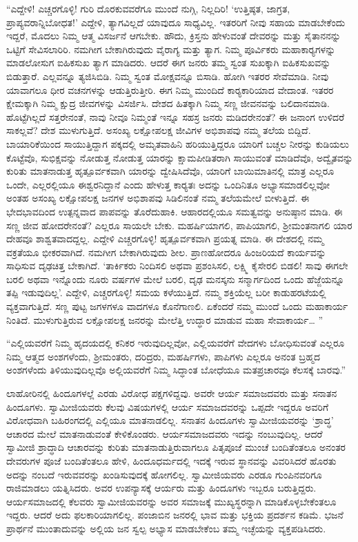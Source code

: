  “ಎದ್ದೇಳಿ! ಎಚ್ಚರಗೊಳ್ಳಿ! ಗುರಿ ದೊರಕುವವರೆಗೂ ಮುಂದೆ ನುಗ್ಗಿ, ನಿಲ್ಲದಿರಿ! ‘ಉತ್ತಿಷ್ಠತ, ಜಾಗ್ರತ, ಪ್ರಾಪ್ಯವರಾನ್ನಿಬೋಧತ!’ ಎದ್ದೇಳಿ, ತ್ಯಾಗವಿಲ್ಲದೆ ಯಾವುದೂ ಸಾಧ್ಯವಿಲ್ಲ. ಇತರರಿಗೆ ನೀವು ಸಹಾಯ ಮಾಡಬೇಕೆಂದು ಇದ್ದರೆ, ಮೊದಲು ನಿಮ್ಮ ಆತ್ಮ ವಿಸರ್ಜನೆ ಆಗಬೇಕು. ಹೌದು, ಕ್ರಿಸ್ತನು ಹೇಳುವಂತೆ ದೇವರನ್ನು ಮತ್ತು ಸೈತಾನನನ್ನು ಒಟ್ಟಿಗೆ ಸೇವಿಸಲಾರಿರಿ. ನಮಗೀಗ ಬೇಕಾಗಿರುವುದು ವೈರಾಗ್ಯ ಮತ್ತು ತ್ಯಾಗ. ನಿಮ್ಮ ಪೂರ್ವಿಕರು ಮಹಾಕಾರ‍್ಯಗಳನ್ನು ಮಾಡಲೋಸುಗ ಐಹಿಕಸುಖ ತ್ಯಾಗ ಮಾಡಿದರು. ಆದರೆ ಈಗ ಜನರು ತಮ್ಮ ಸ್ವಂತ ಸುಖಕ್ಕಾಗಿ ಐಹಿಕಸುಖವನ್ನು ಬಿಡುತ್ತಾರೆ. ಎಲ್ಲವನ್ನೂ ತ್ಯಜಿಸಿಬಿಡಿ. ನಿಮ್ಮ ಸ್ವಂತ ಮೋಕ್ಷವನ್ನೂ ಬಿಸಾಡಿ. ಹೋಗಿ ಇತರರ ಸೇವೆಮಾಡಿ. ನೀವು ಯಾವಾಗಲೂ ಧೀರ ವಚನಗಳನ್ನು ಆಡುತ್ತಿರುತ್ತೀರಿ. ಈಗ ನಿಮ್ಮ ಮುಂದಿದೆ ಕಾರ‍್ಯಕಾರಿಯಾದ ವೇದಾಂತ. ಇತರರ ಕ್ಷೇಮಕ್ಕಾಗಿ ನಿಮ್ಮ ಕ್ಷುದ್ರ ಜೀವಗಳನ್ನು ವಿಸರ್ಜಿಸಿ. ದೇಶದ ಹಿತಕ್ಕಾಗಿ ನಿಮ್ಮ ಸಣ್ಣ ಜೀವನವನ್ನು ಬಲಿದಾನಮಾಡಿ. ಹೊಟ್ಟೆಗಿಲ್ಲದೆ ಸತ್ತರೇನಂತೆ, ನಾವು ನೀವೂ ನಿಮ್ಮಂತೆ ಇನ್ನೂ ಸಹಸ್ರ ಜನರು ಮಡಿದರೇನಂತೆ? ಈ ಜನಾಂಗ ಉಳಿದರೆ ಸಾಕಲ್ಲವೆ? ದೇಶ ಮುಳುಗುತ್ತಿದೆ. ಅಸಂಖ್ಯ ಲಕ್ಷೋಪಲಕ್ಷ ಜೀವಿಗಳ ಅಭಿಶಾಪವು ನಮ್ಮ ತಲೆಯ ಬಿದ್ದಿದೆ. ಬಾಯಾರಿಕೆಯಿಂದ ಸಾಯುತ್ತಿದ್ದಾಗ ಪಕ್ಕದಲ್ಲಿ ಅಮೃತವಾಹಿನಿ ಹರಿಯುತ್ತಿದ್ದರೂ ಯಾರಿಗೆ ಬಚ್ಚಲ ನೀರನ್ನು ಕುಡಿಯಲು ಕೊಟ್ಟೆವೊ, ಸುಭಿಕ್ಷವನ್ನು ನೋಡುತ್ತ ನೋಡುತ್ತ ಯಾರನ್ನು ಕ್ಷಾಮಪೀಡಿತರಾಗಿ ಸಾಯುವಂತೆ ಮಾಡಿದೆವೊ, ಅದ್ವೈತವನ್ನು ಕುರಿತು ಮಾತನಾಡುತ್ತ ಹೃತ್ಪೂರ್ವಕವಾಗಿ ಯಾರನ್ನು ದ್ವೇಷಿಸಿದೆವೊ, ಯಾರಿಗೆ ಬಾಯಿಮಾತಿನಲ್ಲಿ ಮಾತ್ರ ಎಲ್ಲರೂ ಒಂದೇ, ಎಲ್ಲರಲ್ಲಿಯೂ ಈಶ್ವರನಿದ್ದಾನೆ ಎಂದು ಹೇಳುತ್ತ ಕಾರ‍್ಯತಃ ಅದನ್ನು ಒಂದಿನಿತೂ ಅಭ್ಯಾಸಮಾಡಲಿಲ್ಲವೋ ಅಂತಹ ಅಸಂಖ್ಯ ಲಕ್ಷೋಪಲಕ್ಷ ಜನಗಳ ಅಭಿಶಾಪವು ಸಿಡಿಲಿನಂತೆ ನಮ್ಮ ತಲೆಯಮೇಲೆ ಬೀಳುತ್ತಿದೆ. ಈ ಭೇದಭಾವದಿಂದ ಉತ್ಪನ್ನವಾದ ಪಾಪವನ್ನು ತೊರೆದುಹಾಕಿ. ಆಹಾರದಲ್ಲಿಯೂ ಸಮತ್ವವನ್ನು ಅನುಷ್ಠಾನ ಮಾಡಿ. ಈ ಸಣ್ಣ ಜೀವ ಹೋದರೇನಂತೆ? ಎಲ್ಲರೂ ಸಾಯಲೇ ಬೇಕು. ಮಹರ್ಷಿಯಾಗಲಿ, ಪಾಪಿಯಾಗಲಿ, ಶ‍್ರೀಮಂತನಾಗಲಿ ಯಾರ ದೇಹವೂ ಶಾಶ್ವತವಾದದ್ದಲ್ಲ. ಎದ್ದೇಳಿ ಎಚ್ಚರಗೊಳ್ಳಿ! ಹೃತ್ಪೂರ್ವಕವಾಗಿ ಪ್ರಯತ್ನ ಮಾಡಿ. ಈ ದೇಶದಲ್ಲಿ ನಮ್ಮ ವಕ್ರತೆಯೂ ಭೀಕರವಾಗಿದೆ. ನಮಗೀಗ ಬೇಕಾಗಿರುವುದು ಶೀಲ. ಪ್ರಾಣಹೋದರೂ ಹಿಂಜರಿಯದೆ ಕಾರ್ಯವನ್ನು ಸಾಧಿಸುವ ದೃಢಚಿತ್ತ ಬೇಕಾಗಿದೆ. ‘ತಾರ್ಕಿಕರು ನಿಂದಿಸಲಿ ಅಥವಾ ಪ್ರಶಂಸಿಸಲಿ, ಲಕ್ಷ್ಮಿ ಕೈಸೇರಲಿ ಬಿಡಲಿ! ಸಾವು ಈಗಲೇ ಬರಲಿ ಅಥವಾ ಇನ್ನೊಂದು ನೂರು ವರ್ಷಗಳ ಮೇಲೆ ಬರಲಿ, ದೃಢ ಮನಸ್ಕನು ಸನ್ಮಾರ್ಗದಿಂದ ಒಂದು ಹೆಜ್ಜೆಯನ್ನೂ ತಪ್ಪಿ ಇಡುವುದಿಲ್ಲ’. ಎದ್ದೇಳಿ, ಎಚ್ಚರಗೊಳ್ಳಿ! ಸಮಯ ಕಳೆಯುತ್ತಿದೆ. ನಮ್ಮ ಶಕ್ತಿಯೆಲ್ಲ ಬರೀ ಕಾಡುಹರಟೆಯಲ್ಲಿ ವ್ಯಕ್ತವಾಗುತ್ತಿದೆ. ಸಣ್ಣ ಪುಟ್ಟ ಜಗಳಗಳೂ ವಾದಗಳೂ ಕೊನೆಗಾಣಲಿ. ಏಕೆಂದರೆ ನಮ್ಮ ಮುಂದೆ ಒಂದು ಮಹಾಕಾರ್ಯ ನಿಂತಿದೆ. ಮುಳುಗುತ್ತಿರುವ ಲಕ್ಷೋಪಲಕ್ಷ ಜನರನ್ನು ಮೇಲೆತ್ತಿ ಉದ್ಧಾರ ಮಾಡುವ ಮಹಾ ಸೇವಾಕಾರ್ಯ… ” 

 “ಎಲ್ಲಿಯವರೆಗೆ ನಿಮ್ಮ ಹೃದಯದಲ್ಲಿ ಕನಿಕರ ಇರುವುದಿಲ್ಲವೋ, ಎಲ್ಲಿಯವರೆಗೆ ವೇದಗಳು ಬೋಧಿಸುವಂತೆ ಎಲ್ಲರೂ ನಿಮ್ಮ ಆತ್ಮದ ಅಂಶಗಳೆಂದು, ಶ‍್ರೀಮಂತರು, ದರಿದ್ರರು, ಮಹರ್ಷಿಗಳು, ಪಾಪಿಗಳು ಎಲ್ಲರೂ ಅನಂತ ಬ್ರಹ್ಮದ ಅಂಶಗಳೆಂದು ತಿಳಿಯುವುದಿಲ್ಲವೊ ಅಲ್ಲಿಯವರೆಗೆ ನಿಮ್ಮ ಸಿದ್ಧಾಂತ ಬೋಧೆಯೂ ಮತಪ್ರಚಾರವೂ ಕೆಲಸಕ್ಕೆ ಬಾರವು.” 

 ಲಾಹೋರಿನಲ್ಲಿ ಹಿಂದೂಗಳಲ್ಲೆ ಎರಡು ವಿರೋಧ ಪಕ್ಷಗಳಿದ್ದವು. ಅವರೇ ಆರ್ಯ ಸಮಾಜದವರು ಮತ್ತು ಸನಾತನ ಹಿಂದೂಗಳು. ಸ್ವಾಮೀಜಿಯವರು ಕೆಲವು ವಿಷಯಗಳಲ್ಲಿ ಆರ್ಯ ಸಮಾಜದವರನ್ನು ಒಪ್ಪದೇ ಇದ್ದರೂ ಅವರಿಗೆ ವಿರೋಧವಾಗಿ ಬಹಿರಂಗದಲ್ಲಿ ಎಲ್ಲಿಯೂ ಮಾತನಾಡಲಿಲ್ಲ. ಸನಾತನ ಹಿಂದೂಗಳು ಸ್ವಾಮೀಜಿಯವರನ್ನು ‘ಶ್ರಾದ್ಧ’ ಆಚಾರದ ಮೇಲೆ ಮಾತನಾಡುವಂತೆ ಕೇಳಿಕೊಂಡರು. ಆರ್ಯಸಮಾಜದವರು ಇದನ್ನು ನಂಬುವುದಿಲ್ಲ. ಆದರೆ ಸ್ವಾಮೀಜಿ ಶ್ರಾದ್ಧಾದಿ ಆಚಾರವನ್ನು ಕುರಿತು ಮಾತನಾಡುತ್ತಿರುವಾಗಲೂ ಪಿತೃಪೂಜೆ ಮುಂಚೆ ಬಂದಿತೆಂತಲೂ ಅನಂತರ ದೇವರುಗಳ ಪೂಜೆ ಬಂದಿತೆಂತಲೂ ಹೇಳಿ, ಹಿಂದೂಧರ್ಮದಲ್ಲಿ ಇದಕ್ಕೆ ಇರುವ ಸ್ಥಾನವನ್ನು ವಿವರಿಸಿದರೆ ಹೊರತು ಅದನ್ನು ನಂಬದೆ ಇರುವವರನ್ನು ಖಂಡಿಸುವುದಕ್ಕೆ ಹೋಗಲಿಲ್ಲ. ಸ್ವಾಮೀಜಿಯವರು ಎರಡೂ ಗುಂಪಿನವರಿಗೂ ರಾಜಿಮಾಡಲು ಯತ್ನಿಸಿದರು. ಅವರ ಉಪನ್ಯಾಸಕ್ಕೆ ಆರ್ಯರು ಮತ್ತು ಹಿಂದೂಗಳು ಇಬ್ಬರೂ ಬರುತ್ತಿದ್ದರು. ಆರ್ಯಸಮಾಜದಲ್ಲಿ ಕೆಲವರು ಸ್ವಾಮೀಜಿಯವರನ್ನು ಅವರ ಸಮಾಜಕ್ಕೆ ಮುಖ್ಯಸ್ಥರನ್ನಾಗಿ ಮಾಡಿಕೊಳ್ಳಬೇಕೆಂತಲೂ ಇದ್ದರು. ಆದರೆ ಅದು ಫಲಕಾರಿಯಾಗಲಿಲ್ಲ. ಪಂಜಾಬಿನ ಜನರಲ್ಲಿ ಭಾವ ಮತ್ತು ಭಕ್ತಿಯ ಪ್ರದರ್ಶನ ಕಡಿಮೆ. ಭಜನೆ ಪ್ರಾರ್ಥನೆ ಮುಂತಾದುವನ್ನು ಅಲ್ಲಿಯ ಜನ ಸ್ವಲ್ಪ ಅಭ್ಯಾಸ ಮಾಡಬೇಕೆಂಬ ತಮ್ಮ ಇಚ್ಛೆಯನ್ನು ವ್ಯಕ್ತಪಡಿಸಿದರು. 

